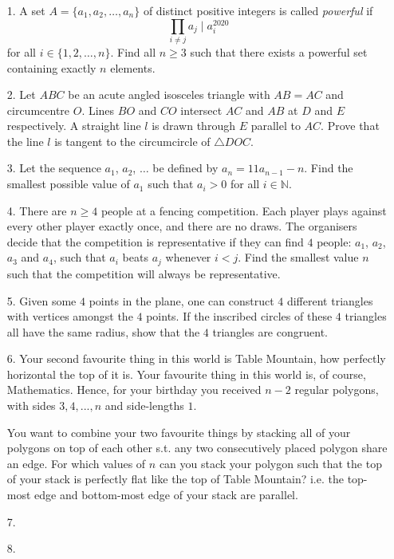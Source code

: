 \documentclass{article}
\begin{document}
\begin{enumerate}

\bigskip
\item[1.] %
A set $A = \{a_1, a_2, \dotsc, a_n\}$ of distinct positive integers is called \emph{powerful} if
\[ \prod_{i \neq j} a_j \mid a_i^{2020} \]
for all $i \in \{1, 2, \dotsc, n\}$.
Find all $n \ge 3$ such that there exists a powerful set containing exactly $n$ elements.


\medskip
\item[2.] %
Let $ABC$ be an acute angled isosceles triangle with $AB = AC$ and circumcentre $O$.
Lines $BO$ and $CO$ intersect $AC$ and $AB$ at $D$ and $E$ respectively.
A straight line $l$ is drawn through $E$ parallel to $AC$.
Prove that the line $l$ is tangent to the circumcircle of $\triangle DOC$.


\medskip
\item[3.] %
Let the sequence $a_1$, $a_2$, $\dotsc$ be defined by $a_n = 11 a_{n - 1} - n$.
Find the smallest possible value of $a_1$ such that $a_i > 0$ for all $i \in \mathbb{N}$.


\medskip
\item[4.] %
There are $n \ge 4$ people at a fencing competition.
Each player plays against every other player exactly once, and there are no draws.
The organisers decide that the competition is representative if they can find $4$ people: $a_1$, $a_2$, $a_3$ and $a_4$, such that $a_i$ beats $a_j$ whenever $i < j$.
Find the smallest value $n$ such that the competition will always be representative.


\medskip
\item[5.] %
Given some $4$ points in the plane, one can construct $4$ different triangles with vertices amongst the $4$ points. If the inscribed circles
of these $4$ triangles all have the same radius, show that the $4$ triangles are congruent. 


\medskip
\item[6.] %
Your second favourite thing in this world is Table Mountain, how perfectly horizontal the top of it is. Your favourite thing in this world is, of course, Mathematics. Hence, for your birthday you received $n-2$ regular polygons, with sides $3,4,...,n$ and side-lengths $1$. 

You want to combine your two favourite things by stacking all of your polygons on top of each other s.t. any two consecutively placed polygon share an edge. For which values of $n$ can you stack your polygon such that the top of your stack is perfectly flat like the top of Table Mountain? i.e. the top-most edge and bottom-most edge of your stack are parallel.


\medskip
\item[7.] %


\medskip
\item[8.] %

\end{enumerate}
\end{document}
